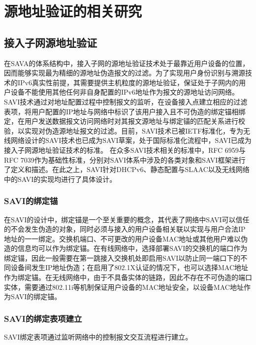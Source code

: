   \section{源地址验证的相关研究}
  \label{survey:sava}

    \subsection{接入子网源地址验证}
    \label{survey:sava:access}
    在SAVA\cite{RFC5210}的体系结构中，接入子网的源地址验证技术处于最靠近用户设备的位置，因而能够实现最为精细的源地址伪造报文的过滤。为了实现用户身份识别与溯源技术的IPv6真实性前提，其需要提供主机粒度的源地址验证，保证处于子网内的用户设备不能使用其他任何非自身配置的IPv6地址作为报文的源地址访问网络。SAVI技术\cite{RFC7039,RFC6959,RFC6620,RFC7513,RFC7219,I-D.bi-savi-wlan}通过对地址配置过程中控制报文的监听，在设备接入点建立相应的过滤表项，将用户配置的IP地址与网络中标识了该用户接入且不可伪造的绑定锚相绑定，在用户发送数据报文访问网络时对其报文源地址与绑定锚的匹配关系进行校验，以实现对伪造源地址报文的过滤。目前，SAVI技术已被IETF标准化，专为无线网络设计的SAVI技术\cite{I-D.bi-savi-wlan}也已成为SAVI草案，处于国际标准化流程中，SAVI已成为接入子网源地址验证技术的标准。
    在众多SAVI技术相关的标准中，RFC 6959\cite{RFC6959}与RFC 7039\cite{RFC7039}作为基础性标准，分别对SAVI体系中涉及的各类对象和SAVI框架进行了定义和描述。在此之上，SAVI针对DHCPv6、静态配置与SLAAC以及无线网络中的SAVI的实现均进行了具体设计。

      \subsubsection{SAVI的绑定锚}
      \label{survey:sava:access:anchor}
      在SAVI的设计中，绑定锚是一个至关重要的概念，其代表了网络中SAVI可以信任的不会发生伪造的对象，同时必须与接入的用户设备相关联以实现与用户合法IP地址的一一绑定。交换机端口、不可更改的用户设备MAC地址或其他用户难以伪造的信息均可以作为绑定锚\cite{RFC6959}。在有线网络中，选择部署SAVI的交换机的端口作为绑定锚，因此一般需要在第一跳接入交换机处即启用SAVI以防止同一端口下的不同设备间发生IP地址伪造；在启用了802.1X认证的情况下，也可以选择MAC地址作为绑定锚\cite{RFC6959}。在无线网络中，由于不具备实体的链路，因此不存在不可伪造的端口实体，需要通过802.11i\cite{IEEE80211i}等机制保证用户设备的MAC地址安全，以设备MAC地址作为SAVI的绑定锚。

      \subsubsection{SAVI的绑定表项建立}
      \label{survey:sava:access:listen}
      SAVI绑定表项通过监听网络中的控制报文交互流程进行建立。
      
